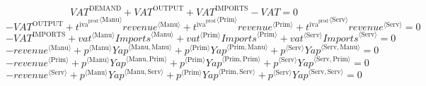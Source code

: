 \begin{equation}
{V\!A\!T}^{\mathrm{DEMAND}} + {V\!A\!T}^{\mathrm{OUTPUT}} + {V\!A\!T}^{\mathrm{IMPORTS}} - {V\!A\!T} = 0
\end{equation}
\begin{equation}
-{V\!A\!T}^{\mathrm{OUTPUT}} + {{t^{\mathrm{iva}^{\mathrm{prod}}}}^{\langle \mathrm{\mathrm{Manu}}\rangle}} {{{r\!e\!v\!e\!n\!u\!e}}^{\langle \mathrm{Manu}\rangle}} + {{t^{\mathrm{iva}^{\mathrm{prod}}}}^{\langle \mathrm{\mathrm{Prim}}\rangle}} {{{r\!e\!v\!e\!n\!u\!e}}^{\langle \mathrm{Prim}\rangle}} + {{t^{\mathrm{iva}^{\mathrm{prod}}}}^{\langle \mathrm{\mathrm{Serv}}\rangle}} {{{r\!e\!v\!e\!n\!u\!e}}^{\langle \mathrm{Serv}\rangle}} = 0
\end{equation}
\begin{equation}
-{V\!A\!T}^{\mathrm{IMPORTS}} + {{{v\!a\!t}}^{\langle \mathrm{\mathrm{Manu}}\rangle}} {{{I\!m\!p\!o\!r\!t\!s}}^{\langle \mathrm{Manu}\rangle}} + {{{v\!a\!t}}^{\langle \mathrm{\mathrm{Prim}}\rangle}} {{{I\!m\!p\!o\!r\!t\!s}}^{\langle \mathrm{Prim}\rangle}} + {{{v\!a\!t}}^{\langle \mathrm{\mathrm{Serv}}\rangle}} {{{I\!m\!p\!o\!r\!t\!s}}^{\langle \mathrm{Serv}\rangle}} = 0
\end{equation}
\begin{equation}
-{{r\!e\!v\!e\!n\!u\!e}}^{\langle \mathrm{Manu}\rangle} + {{p}^{\langle \mathrm{Manu}\rangle}} {{{Y\!a\!p}}^{\langle \mathrm{Manu},\mathrm{Manu}\rangle}} + {{p}^{\langle \mathrm{Prim}\rangle}} {{{Y\!a\!p}}^{\langle \mathrm{Prim},\mathrm{Manu}\rangle}} + {{p}^{\langle \mathrm{Serv}\rangle}} {{{Y\!a\!p}}^{\langle \mathrm{Serv},\mathrm{Manu}\rangle}} = 0
\end{equation}
\begin{equation}
-{{r\!e\!v\!e\!n\!u\!e}}^{\langle \mathrm{Prim}\rangle} + {{p}^{\langle \mathrm{Manu}\rangle}} {{{Y\!a\!p}}^{\langle \mathrm{Manu},\mathrm{Prim}\rangle}} + {{p}^{\langle \mathrm{Prim}\rangle}} {{{Y\!a\!p}}^{\langle \mathrm{Prim},\mathrm{Prim}\rangle}} + {{p}^{\langle \mathrm{Serv}\rangle}} {{{Y\!a\!p}}^{\langle \mathrm{Serv},\mathrm{Prim}\rangle}} = 0
\end{equation}
\begin{equation}
-{{r\!e\!v\!e\!n\!u\!e}}^{\langle \mathrm{Serv}\rangle} + {{p}^{\langle \mathrm{Manu}\rangle}} {{{Y\!a\!p}}^{\langle \mathrm{Manu},\mathrm{Serv}\rangle}} + {{p}^{\langle \mathrm{Prim}\rangle}} {{{Y\!a\!p}}^{\langle \mathrm{Prim},\mathrm{Serv}\rangle}} + {{p}^{\langle \mathrm{Serv}\rangle}} {{{Y\!a\!p}}^{\langle \mathrm{Serv},\mathrm{Serv}\rangle}} = 0
\end{equation}
